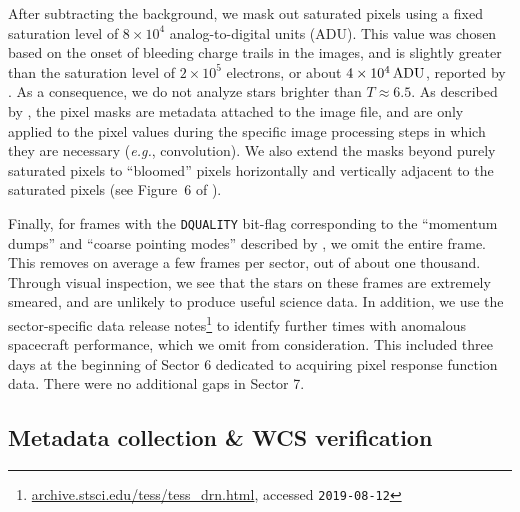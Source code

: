 \documentclass[12pt,twocolumn,tighten]{aastex62}
\begin{document}

After subtracting the background, we mask out saturated pixels using a
fixed saturation level of $8\times10^4$ analog-to-digital units (ADU).
This value was chosen based on the onset of bleeding charge trails in
the images, and is slightly greater than the saturation level of
$2\times10^5$ electrons, or about $4\times10^4\,{\rm ADU}$, reported
by \citet{vanderspek_2018}.  As a consequence, we do not analyze stars
brighter than $T\approx 6.5$.  As described by \citet{Pal_2009}, the
pixel masks are metadata attached to the image file, and are only
applied to the pixel values during the specific image processing steps
in which they are necessary ({\it e.g.}, convolution). We also extend
the masks beyond purely saturated pixels to ``bloomed'' pixels
horizontally and vertically adjacent to the saturated pixels (see
Figure~6 of \citealt{Pal_2009}).

Finally, for frames with the \texttt{DQUALITY} bit-flag corresponding
to the ``momentum dumps'' and ``coarse pointing modes'' described by
\citet{vanderspek_2018}, we omit the entire frame.  This removes on
average a few frames per sector, out of about one thousand. Through
visual inspection, we see that the stars on these frames are extremely
smeared, and are unlikely to produce useful science data.  In
addition, we use the sector-specific data release notes\footnote{\url{
  archive.stsci.edu/tess/tess_drn.html}, accessed \texttt{2019-08-12}} to identify further times
with anomalous spacecraft performance, which we omit from
consideration.  This included three days at the beginning of Sector 6
dedicated to acquiring pixel response function data. There were no
additional gaps in Sector 7.

\subsection{Metadata collection \& WCS verification}
\label{subsec:metadatacollection}
\end{document}
